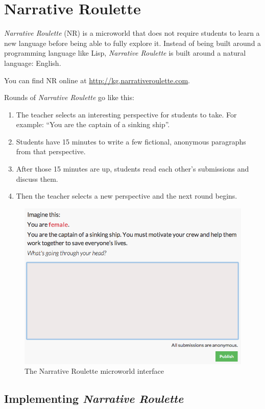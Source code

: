 \section{Narrative Roulette}

\emph{Narrative Roulette} (NR) is a microworld that does not require
students to learn a new language before being able to fully explore it.
Instead of being built around a programming language like Lisp,
\emph{Narrative Roulette} is built around a natural language: English.

You can find NR online at \url{http://kg.narrativeroulette.com}.

Rounds of \emph{Narrative Roulette} go like this: 

\begin{enumerate}
\item The teacher selects an interesting perspective for students to take. For example:
``You are the captain of a sinking ship''. 
\item Students have 15 minutes to write a few fictional, anonymous paragraphs from that perspective. 
\item After those 15 minutes are up, students read each other's
submissions and discuss them.
\item Then the teacher selects a new perspective and the next round begins. 
\end{enumerate}

\begin{figure}[ht!]
\centering
\includegraphics[width=115mm]{img/narrative_editor.png}
\caption{The Narrative Roulette microworld interface}
\label{overflow}
\end{figure}

\subsection{Implementing \textit{Narrative Roulette}}

